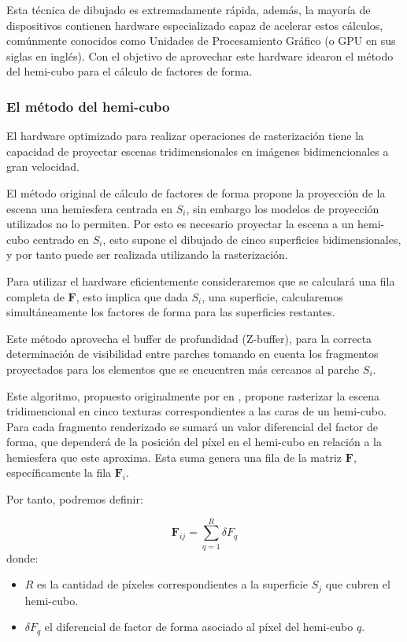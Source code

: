 Esta técnica de dibujado es extremadamente rápida, además, la mayoría de dispositivos contienen hardware especializado capaz de acelerar estos cálculos, comúnmente conocidos como Unidades de Procesamiento Gráfico (o GPU en sus siglas en inglés). Con el objetivo de aprovechar este hardware \citeauthor{Cohen} idearon el método del hemi-cubo para el cálculo de factores de forma.

\subsubsection{El método del hemi-cubo}

El hardware optimizado para realizar operaciones de rasterización tiene la capacidad de proyectar escenas tridimensionales en imágenes bidimencionales a gran velocidad. 

El método original de cálculo de factores de forma propone la proyección de la escena una hemiesfera centrada en $S_{i}$, sin embargo los modelos de proyección utilizados no lo permiten. Por esto es necesario proyectar la escena a un hemi-cubo centrado en $S_{i}$, esto supone el dibujado de cinco superficies bidimensionales, y por tanto puede ser realizada utilizando la rasterización.

Para utilizar el hardware eficientemente consideraremos que se calculará una fila completa de $\mathbf{F}$, esto implica que dada $S_{i}$, una superficie, calcularemos simultáneamente los factores de forma para las superficies restantes. 

Este método aprovecha el buffer de profundidad (Z-buffer), para la correcta determinación de visibilidad entre parches tomando en cuenta los fragmentos proyectados para los elementos que se encuentren más cercanos al parche $S_{i}$.

Este algoritmo, propuesto originalmente por \citeauthor{Cohen} en \citeyear{Cohen}, propone rasterizar la escena tridimencional en cinco texturas correspondientes a las caras de un hemi-cubo. Para cada fragmento renderizado se sumará un valor diferencial del factor de forma, que dependerá de la posición del píxel en el hemi-cubo en relación a la hemiesfera que este aproxima. Esta suma genera una fila de la matriz $\mathbf{F}$, específicamente la fila $\mathbf{F}_{i}$.

Por tanto, podremos definir:

\begin{equation}
	\mathbf{F}_{ij} = \sum_{q=1}^{R} \delta{F_{q}}
	\label{eq:ffgreenberg}
\end{equation}
donde:
\begin{itemize}
	\item $R$ es la cantidad de píxeles correspondientes a la superficie $S_{j}$ que cubren el hemi-cubo.
	\item $\delta{F_{q}}$ el diferencial de factor de forma asociado al píxel del hemi-cubo $q$.
\end{itemize}

